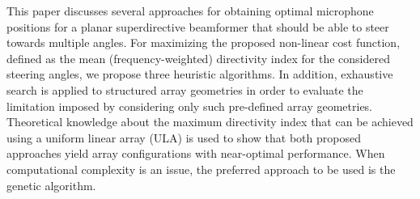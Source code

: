 \documentclass[9pt]{article}
\begin{document}
This paper discusses several approaches for obtaining optimal microphone positions for a planar superdirective beamformer that should be able to steer towards multiple angles. 
For maximizing the proposed non-linear cost function, defined as the mean (frequency-weighted) directivity index for the considered steering angles, we propose three heuristic algorithms.
In addition, exhaustive search is applied to structured array geometries in order to evaluate the limitation imposed by considering only such pre-defined array geometries. Theoretical knowledge about the maximum directivity index that can be achieved using a uniform linear array (ULA) is used to show that both proposed approaches yield array configurations with near-optimal performance. When computational complexity is an issue, the preferred approach to be used is the genetic algorithm. 
\vspace{-0.2cm}
\end{document}
